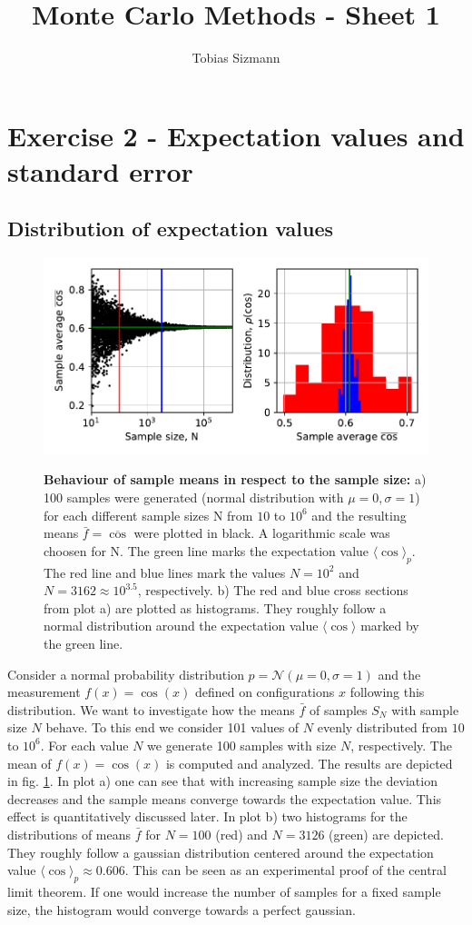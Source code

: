 \documentclass[11pt, a4paper]{article}
\title{Monte Carlo Methods - Sheet 1}
\author{Tobias Sizmann}
\begin{document}
\maketitle
\section{Exercise 2 - Expectation values and standard error}
    \subsection{Distribution of expectation values}
        \begin{figure}
            \includegraphics{fig1.pdf}
            \label{fig1}
            \caption{\textbf{Behaviour of sample means in respect to the sample size:} a) 100 samples were generated (normal distribution with $\mu = 0, \sigma = 1$) for each different sample sizes N from $10$ to $10^6$ and the resulting means $\bar{f} = \overline{\cos}$ were plotted in black. A logarithmic scale was choosen for N. The green line marks the expectation value $\langle \cos \rangle_p$. The red line and blue lines mark the values $N = 10^2$ and $N = 3162 \approx 10^{3.5}$, respectively. b) The red and blue cross sections from plot a) are plotted as histograms. They roughly follow a normal distribution around the expectation value $\langle \cos \rangle$ marked by the green line.}
        \end{figure}

        Consider a normal probability distribution $p = \mathcal{N}(\mu = 0, \sigma = 1)$ and the measurement $f(x) = \cos(x)$ defined on configurations $x$ following this distribution. We want to investigate how the means $\bar{f}$ of samples $S_N$ with sample size $N$ behave. To this end we consider 101 values of $N$ evenly distributed from $10$ to $10^6$. For each value $N$ we generate 100 samples with size $N$, respectively. The mean of $f(x) = \cos(x)$ is computed and analyzed. The results are depicted in fig. \ref{fig1}. In plot a) one can see that with increasing sample size the deviation decreases and the sample means converge towards the expectation value. This effect is quantitatively discussed later. In plot b) two histograms for the distributions of means $\bar{f}$ for $N = 100$ (red) and $N = 3126$ (green) are depicted. They roughly follow a gaussian distribution centered around the expectation value $\langle \cos \rangle_p \approx 0.606$. This can be seen as an experimental proof of the central limit theorem. If one would increase the number of samples for a fixed sample size, the histogram would converge towards a perfect gaussian.
\end{document}
